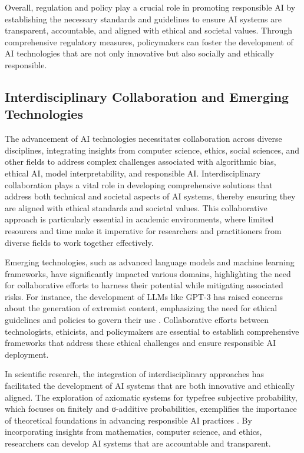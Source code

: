 Overall, regulation and policy play a crucial role in promoting responsible AI by establishing the necessary standards and guidelines to ensure AI systems are transparent, accountable, and aligned with ethical and societal values. Through comprehensive regulatory measures, policymakers can foster the development of AI technologies that are not only innovative but also socially and ethically responsible.



\subsection{Interdisciplinary Collaboration and Emerging Technologies} \label{subsec:Interdisciplinary Collaboration and Emerging Technologies}

The advancement of AI technologies necessitates collaboration across diverse disciplines, integrating insights from computer science, ethics, social sciences, and other fields to address complex challenges associated with algorithmic bias, ethical AI, model interpretability, and responsible AI. Interdisciplinary collaboration plays a vital role in developing comprehensive solutions that address both technical and societal aspects of AI systems, thereby ensuring they are aligned with ethical standards and societal values. This collaborative approach is particularly essential in academic environments, where limited resources and time make it imperative for researchers and practitioners from diverse fields to work together effectively. \cite{korre2023takesvillagemultidisciplinaritycollaboration}



Emerging technologies, such as advanced language models and machine learning frameworks, have significantly impacted various domains, highlighting the need for collaborative efforts to harness their potential while mitigating associated risks. For instance, the development of LLMs like GPT-3 has raised concerns about the generation of extremist content, emphasizing the need for ethical guidelines and policies to govern their use \cite{mcguffie2020radicalizationrisksgpt3advanced}. Collaborative efforts between technologists, ethicists, and policymakers are essential to establish comprehensive frameworks that address these ethical challenges and ensure responsible AI deployment.



In scientific research, the integration of interdisciplinary approaches has facilitated the development of AI systems that are both innovative and ethically aligned. The exploration of axiomatic systems for typefree subjective probability, which focuses on finitely and σ-additive probabilities, exemplifies the importance of theoretical foundations in advancing responsible AI practices \cite{cieslinski2022axiomstypefreesubjectiveprobability}. By incorporating insights from mathematics, computer science, and ethics, researchers can develop AI systems that are accountable and transparent.



